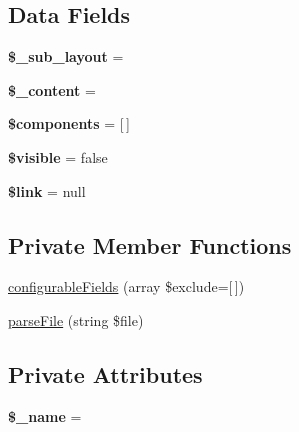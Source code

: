 \subsection*{Data Fields}
\begin{DoxyCompactItemize}
\item 
\mbox{\label{class_lora_1_1_page_view_a1a9789c0b0363f3e9c69c9d0659497cc}} 
{\bfseries \$\+\_\+sub\+\_\+layout} = \textquotesingle{}\textquotesingle{}
\item 
\mbox{\label{class_lora_1_1_page_view_a921d8b4050e6b39e1507f14dea363ebf}} 
{\bfseries \$\+\_\+content} = \textquotesingle{}\textquotesingle{}
\item 
\mbox{\label{class_lora_1_1_page_view_a2409c247baf67a1d4c6b9a1789cfc088}} 
{\bfseries \$components} = \mbox{[}$\,$\mbox{]}
\item 
\mbox{\label{class_lora_1_1_page_view_a393fcb2f39dd1ec57feb8c377fd1c22e}} 
{\bfseries \$visible} = false
\item 
\mbox{\label{class_lora_1_1_page_view_a5d346e31b75d916e3bac9cb193bfc97f}} 
{\bfseries \$link} = null
\end{DoxyCompactItemize}
\subsection*{Private Member Functions}
\begin{DoxyCompactItemize}
\item 
\hyperlink{class_lora_1_1_page_view_a3b38056ae9a3c2cada8000895f46b9cb}{configurable\+Fields} (array \$exclude=\mbox{[}$\,$\mbox{]})
\item 
\hyperlink{class_lora_1_1_page_view_a63ba1656485acf76a0d23e8f64fdfa1d}{parse\+File} (string \$file)
\end{DoxyCompactItemize}
\subsection*{Private Attributes}
\begin{DoxyCompactItemize}
\item 
\mbox{\label{class_lora_1_1_page_view_a1c89defaf5aa7ac8e526065e8572f580}} 
{\bfseries \$\+\_\+name} = \textquotesingle{}\textquotesingle{}
\end{DoxyCompactItemize}


